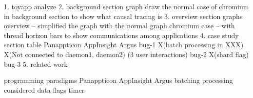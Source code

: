 1. toyapp analyze
2. background section graph
    draw the normal case of chromium in background section to show what causal tracing is
3. overview section graphs
    overview -- simplified the graph with the normal graph
    chromium case -- with thread horizon bars to show communications among applications
4. case study section table
            Panappticon                         AppInsight                                  Argus
    bug-1   X(batch processing in XXX)         X(Not connected to daemon1, daemon2)         (3 user interactions)
    bug-2   X(shard flag)
    bug-3 
5. related work
                            
    programming paradigms   Panappticon          AppInsight                 Argus 
    batching processing                                                  considered
    data flags
    timer
